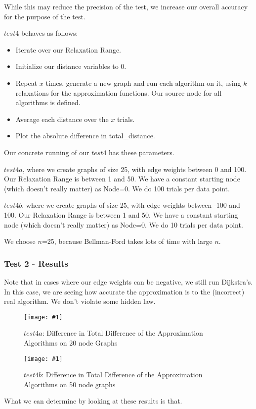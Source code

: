 \documentclass{article}
\newcommand{\figureInsetScaled}[3]
{
    \FloatBarrier{}
    \begin{figure}[ht!]
        \centering
        \texttt{[image: \#1]}
        \caption{#2}
    \end{figure}
    \FloatBarrier{}
}
\begin{document}
While this may reduce the precision of the test, we increase our overall accuracy for the purpose of the test.

$test4$ behaves as follows:
\begin{itemize}
    \item Iterate over our Relaxation Range.
    \item Initialize our distance variables to 0.
    \item Repeat $x$ times, generate a new graph and run each algorithm on it, using $k$ relaxations for the approximation functions. Our source node for all algorithms is defined.
    \item Average each distance over the $x$ trials.
    \item Plot the absolute difference in total\_distance.
\end{itemize}

Our concrete running of our $test4$ has these parameters.

$test4a$, where we create graphs of size 25, with edge weights between 0 and 100. Our Relaxation Range is between 1 and 50.
We have a constant starting node (which doesn't really matter) as Node=0. We do 100 trials per data point.

$test4b$, where we create graphs of size 25, with edge weights between -100 and 100. Our Relaxation Range is between 1 and 50.
We have a constant starting node (which doesn't really matter) as Node=0. We do 10 trials per data point.

We choose $n$=25, because Bellman-Ford takes lots of time with large $n$.

\subsubsection{Test 2 - Results}

Note that in cases where our edge weights can be negative, we still run Dijkstra's. In this case, we are seeing how accurate the approximation is to the (incorrect) real algorithm. We don't violate some hidden law.

\figureInsetScaled{images/part1/exp1_4a.png}{$test4a$: Difference in Total Difference of the Approximation Algorithms on 20 node Graphs}{0.8}



\figureInsetScaled{images/part1/exp1_4a.png}{$test4b$: Difference in Total Difference of the Approximation Algorithms on 50 node graphs}{0.8}

What we can determine by looking at these results is that.
\end{document}

